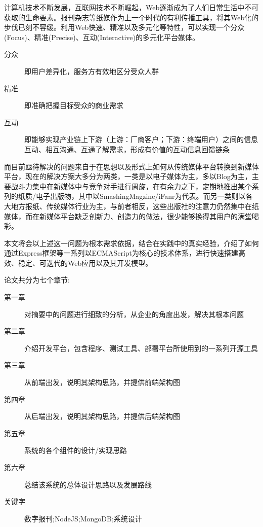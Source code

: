 
\noindent
计算机技术不断发展，互联网技术不断崛起，Web逐渐成为了人们日常生活中不可获取的生命要素。报刊杂志等纸媒作为上一个时代的有利传播工具，将其Web化的步伐已刻不容缓。利用Web快速、精准以及多元化等特性，可以实现一个分众(Focus)、精准(Precise)、互动(Interactive)的多元化平台媒体。

\begin{description}
 	\item[分众] 即用户差异化，服务方有效地区分受众人群
	\item[精准] 即准确把握目标受众的商业需求
	\item[互动] 即能够实现产业链上下游（上游：厂商客户；下游：终端用户）之间的信息互动、相互沟通、互通了解需求，形成有价值的互动信息回馈链条
\end{description}

而目前亟待解决的问题来自于在思想以及形式上如何从传统媒体平台转换到新媒体平台，现在的解决方案大多分为两类，一类是以电子媒体为主，多以Blog为主，主要战斗力集中在新媒体中与竞争对手进行周旋，在有余力之下，定期地推出某个系列的纸质/电子出版物，其中以SmashingMagzine/iFanr为代表。而另一类则以各大地方报纸、传统媒体行业为主，与前者相反，这些出版社的注意力仍然集中在纸媒体，而在新媒体平台缺乏创新力、创造力的做法，很少能够换得其用户的满堂喝彩。

本文将会以上述这一问题为根本需求依据，结合在实践中的真实经验，介绍了如何通过Express框架等一系列以ECMAScript为核心的技术体系，进行快速搭建高效、稳定、可迭代的Web应用以及其开发模型。

\noindent
论文共分为七个章节:

\begin{description}
	\item[第一章] 对摘要中的问题进行细致的分析，从企业的角度出发，解决其根本问题
	\item[第二章] 介绍开发平台，包含程序、测试工具、部署平台所使用到的一系列开源工具
	\item[第三章] 从前端出发，说明其架构思路，并提供前端架构图
	\item[第四章] 从后端出发，说明其架构思路，并提供后端架构图
	\item[第五章] 系统的各个组件的设计/实现思路
	\item[第六章] 总结该系统的总体设计思路以及发展路线
 	\item[关键字] 数字报刊;NodeJS;MongoDB;系统设计
\end{description}

\clearpage